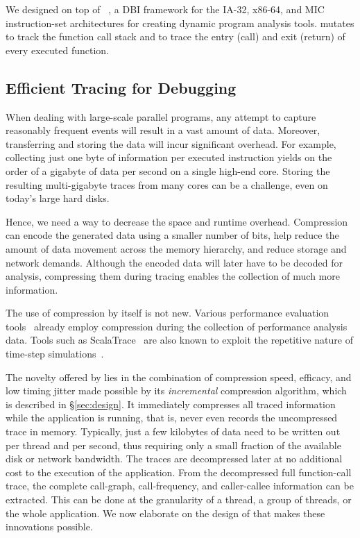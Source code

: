 We designed \parlot on top of \pin~\cite{pin}, a DBI framework for the IA-32, x86-64, and MIC instruction-set architectures for creating dynamic program analysis tools. \parlot mutates \pin to track the function call stack and to trace the entry (call) and exit (return) of every executed function.


\subsection{Efficient Tracing for Debugging}
When dealing with large-scale parallel programs, any attempt to capture reasonably frequent events will result in a vast amount of data. Moreover, transferring and storing the data will incur significant overhead. For example, collecting just one byte of information per executed instruction yields on the order of a gigabyte of data per second on a single high-end core. Storing the resulting multi-gigabyte traces from many cores can be a challenge, even on today's large hard disks.

Hence, we need a way to decrease the space and runtime overhead. Compression can encode the generated data using a smaller number of bits, help
reduce the amount of data movement across the memory hierarchy, and
reduce storage and network demands.
%
Although the encoded data will later have to be decoded for analysis, compressing them during tracing enables the collection of much more information.

The use of compression by itself is not new.
Various performance evaluation tools~\cite{tau,scorep,eventflowgraph} 
already employ compression during the collection
of performance analysis data.
%
Tools such as ScalaTrace~\cite{scalatrace}
are also known to exploit
the repetitive nature of time-step simulations~\cite{freitag}. %


The novelty offered by \parlot lies in the combination of compression
speed, efficacy, and low timing jitter
made possible by its {\em incremental}
compression algorithm, which is
described in \S\ref{sec:design}.
%
It immediately compresses all traced information while the application is running, that is, \parlot never even records the uncompressed trace in memory. 
%
Typically, just a few kilobytes of data need to be written out per thread and per second, thus requiring only a small fraction of the available disk or network bandwidth. 
%
The traces are decompressed later at no additional cost to the execution of the application. 
%
From the decompressed full function-call trace, the complete call-graph, 
call-frequency, and caller-callee information can be extracted. 
%
This can be done at the granularity of a thread, a group of threads, or the whole application.
%
We now elaborate on the design of \parlot that makes
these innovations possible.








